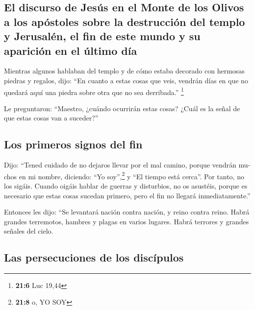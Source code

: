 \begin{paracol}{2}
\begin{otherlanguage}{english}
{\subsection{El discurso de Jesús en el Monte de los Olivos a los
apóstoles sobre la destrucción del templo y Jerusalén, el fin de este
mundo y su aparición en el último
día}\label{el-discurso-de-jesuxfas-en-el-monte-de-los-olivos-a-los-apuxf3stoles-sobre-la-destrucciuxf3n-del-templo-y-jerusaluxe9n-el-fin-de-este-mundo-y-su-apariciuxf3n-en-el-uxfaltimo-duxeda}}

 Mientras algunos hablaban del templo y de cómo estaba
decorado con hermosas piedras y regalos, dijo:  ``En
cuanto a estas cosas que veis, vendrán días en que no quedará aquí una
piedra sobre otra que no sea derribada.'' \footnote{\textbf{21:6} Luc
  19,44}

 Le preguntaron: ``Maestro, ¿cuándo ocurrirán estas cosas?
¿Cuál es la señal de que estas cosas van a suceder?''

\hypertarget{los-primeros-signos-del-fin}{%
\subsection{Los primeros signos del
fin}\label{los-primeros-signos-del-fin}}

 Dijo: ``Tened cuidado de no dejaros llevar por el mal
camino, porque vendrán muchos en mi nombre, diciendo: ``Yo
soy'',\footnote{\textbf{21:8} o, YO SOY} y ``El tiempo está cerca''. Por
tanto, no los sigáis.  Cuando oigáis hablar de guerras y
disturbios, no os asustéis, porque es necesario que estas cosas sucedan
primero, pero el fin no llegará inmediatamente.''

 Entonces les dijo: ``Se levantará nación contra nación,
y reino contra reino.  Habrá grandes terremotos, hambres
y plagas en varios lugares. Habrá terrores y grandes señales del cielo.

\hypertarget{las-persecuciones-de-los-discuxedpulos}{%
\subsection{Las persecuciones de los
discípulos}\label{las-persecuciones-de-los-discuxedpulos}}


\end{otherlanguage}
\end{paracol}
